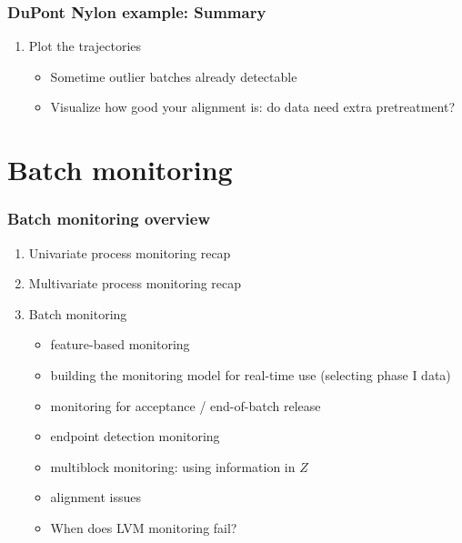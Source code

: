 \documentclass[handout, 12pt]{beamer}
\begin{document}
\begin{frame}\frametitle{DuPont Nylon example: Summary}
	
\begin{enumerate}
	\item	Plot the trajectories
	
			\begin{itemize}
				\item	Sometime outlier batches already detectable
				
				\item	Visualize how good your alignment is: do data need extra pretreatment?
			\end{itemize}
\end{enumerate}


	
\end{frame}

\section{Batch monitoring}

\begin{frame}\frametitle{Batch monitoring overview}

\begin{enumerate}
	\item 	Univariate process monitoring recap
	
	\item	Multivariate process monitoring recap
	
	\item	Batch monitoring
	
		\begin{itemize}
			\item	feature-based monitoring			
			\item	building the monitoring model for real-time use (selecting phase I data)
			\item	monitoring for acceptance / end-of-batch release
			\item	endpoint detection monitoring
			\item	multiblock monitoring: using information in \( Z \)			
			\item	alignment issues
			\item 	When does LVM monitoring fail?
		\end{itemize}
\end{enumerate}
\end{frame}
\end{document}
